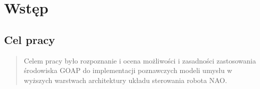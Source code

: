 {
\chapter{Wstęp}

\section{Cel pracy}

\begin{quote}
Celem pracy było rozpoznanie i ocena możliwości i zasadności zastosowania środowiska GOAP do implementacji poznawczych modeli umysłu w wyższych warstwach architektury układu sterowania robota NAO.
\end{quote}



}